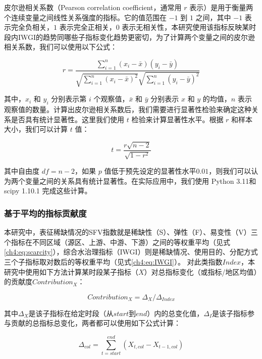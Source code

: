 皮尔逊相关系数（Pearson correlation coefficient，通常用 $r$ 表示）是用于衡量两个连续变量之间线性关系强度的指标。它的值范围在 $-1$ 到 $1$ 之间，其中 $-1$ 表示完全负相关，$1$ 表示完全正相关，$0$ 表示无相关性，本研究使用该指标反映某时段内IWGI的趋势同哪些子指标变化趋势更密切，为了计算两个变量之间的皮尔逊相关系数，我们可以使用以下公式：

\begin{equation}
    r = \frac{\sum_{i=1}^{n}(x_i - \bar{x})(y_i - \bar{y})}{\sqrt{\sum_{i=1}^{n}{(x_i - \bar{x})}^2}\sqrt{\sum_{i=1}^{n}{(y_i - \bar{y})}^2}}
\end{equation}

其中，$x_i$ 和 $y_i$ 分别表示第 $i$ 个观察值，$\bar{x}$ 和 $\bar{y}$ 分别表示 $x$ 和 $y$ 的均值，$n$ 表示观察值的数量。计算出皮尔逊相关系数后，我们需要进行显著性检验来确定这种关系是否具有统计显著性。这里我们使用 $t$ 检验来计算显著性水平。根据 $r$ 和样本大小，我们可以计算 $t$ 值：

\begin{equation}
    t = \frac{r\sqrt{n-2}}{\sqrt{1-r^2}}
\end{equation}

其中自由度 $df = n - 2$，如果 $p$ 值低于预先设定的显著性水平$0.01$，则我们可以认为两个变量之间的关系具有统计显著性。在实际应用中，我们使用 Python 3.11和scipy 1.10.1 完成这些计算。

\subsubsection{基于平均的指标贡献度}

本研究中，表征稀缺情况的SFV指数就是稀缺性（S）、弹性（F）、易变性（V）三个指标在不同区域（源区、上游、中游、下游）之间的等权重平均（见式\ref{ch4:eq:scarcity}），综合水治理指标（IWGI）则是稀缺情况、使用目的、分配方式三个子指标取对数后的等权重平均（见式\ref{ch4:eq:IWGI}）。
对此类指数$Index$，本研究中使用如下方法计算某时段某子指标（$X$）对总指标变化（或指标/地区均值）的贡献度$Contribution_{X}$：

\begin{equation}
    Contribution_{X} = \Delta_{X} / \Delta_{Index}
\end{equation}

其中$\Delta_{X}$是该子指标在给定时段（从$start$到$end$）内的总变化值，$\Delta_{I}$是该子指标参与贡献的总指标总变化，两者都可以使用如下公式计算：

\begin{equation}
    \Delta_{col}=\sum_{t=start}^{end}(X_{t, col}-X_{t-1, col})
\end{equation}

